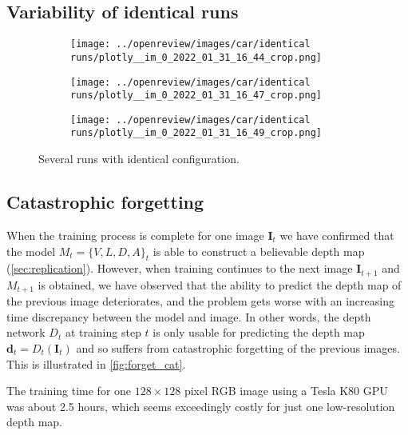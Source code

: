 \subsection{Variability of identical runs}


\begin{figure}[!htb]
\centering
\begin{subfigure}{0.32\textwidth}
    \centering
    \texttt{[image: ../openreview/images/car/identical runs/plotly\_\_im\_0\_2022\_01\_31\_16\_44\_crop.png]}
    \caption{}
    
\end{subfigure}
\begin{subfigure}{0.32\textwidth}
    \centering
    \texttt{[image: ../openreview/images/car/identical runs/plotly\_\_im\_0\_2022\_01\_31\_16\_47\_crop.png]}
    \caption{}
    
\end{subfigure}
\begin{subfigure}{0.32\textwidth}
    \centering
    \texttt{[image: ../openreview/images/car/identical runs/plotly\_\_im\_0\_2022\_01\_31\_16\_49\_crop.png]}
    \caption{}
    
\end{subfigure}
    \caption{Several runs with identical configuration.}
    \label{fig:variability}
\end{figure}

\subsection{Catastrophic forgetting}
\label{sec:forget-appendix}
When the training process is complete for one image $\mathbf{I}_t$ we have confirmed that the model $M_t = \{V, L, D, A\}_t$ is able to construct a believable depth map (\autoref{sec:replication}). However, when training continues to the next image $\mathbf{I}_{t+1}$ and $M_{t+1}$ is obtained, we have observed that the ability  to predict the depth map of the previous image deteriorates, and the problem gets worse with an increasing time discrepancy between the model and image. %
In other words, the depth network $D_{t}$ at training step $t$ is only usable for predicting the depth map $\mathbf{d}_t = D_t(\mathbf{I}_t)$ and so suffers from catastrophic forgetting of the previous images. This is illustrated in \autoref{fig:forget_cat}.

The training time for one $128 \times 128$ pixel RGB image using a Tesla K80 GPU was about 2.5 hours, which seems exceedingly costly for just one low-resolution depth map.

